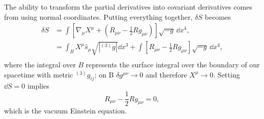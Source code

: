 The ability to transform the partial derivatives into covariant derivatives comes from using normal coordinates. Putting everything together, $\delta S$ becomes
\begin{align}
\delta S &= \int \left[ \nabla_\mu X^\mu + \left( R_{\mu\nu}-\frac{1}{2}Rg_{\mu\nu}\right)\right]\sqrt{-g}\,\dd x^4, \\
&= \int_B X^\mu \hat{s}_\mu \sqrt{|{}^{(3)}g|}\dd x^3 + \int \left[  R_{\mu\nu}-\frac{1}{2}Rg_{\mu\nu}\right]\sqrt{-g}\,\dd x^4, \\
\end{align}
where the integral over $B$ represents the surface integral over the boundary of our spacetime with metric ${}^{(3)}g_{ij}$; on B $\delta g^{\mu\nu}\rightarrow 0 $ and therefore $X^\mu \rightarrow 0$. Setting $\dd S =0$ implies
\begin{equation}
R_{\mu\nu}-\frac{1}{2}Rg_{\mu\nu}=0,
\end{equation} 
which is the vacuum Einstein equation.


